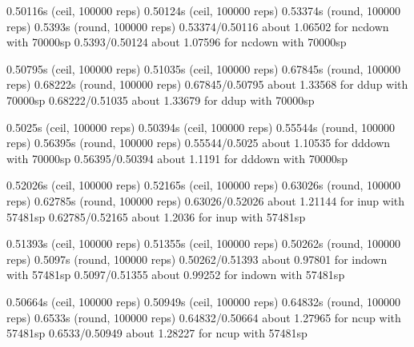 0.50116s (ceil, 100000 reps)                               0.50124s (ceil, 100000 reps)                              
0.53374s (round, 100000 reps)                              0.5393s (round, 100000 reps)                              
0.53374/0.50116 about 1.06502 for ncdown with 70000sp      0.5393/0.50124 about 1.07596 for ncdown with 70000sp      
                                                                                                                     
0.50795s (ceil, 100000 reps)                               0.51035s (ceil, 100000 reps)                              
0.67845s (round, 100000 reps)                              0.68222s (round, 100000 reps)                             
0.67845/0.50795 about 1.33568 for ddup with 70000sp        0.68222/0.51035 about 1.33679 for ddup with 70000sp       
                                                                                                                     
0.5025s (ceil, 100000 reps)                                0.50394s (ceil, 100000 reps)                              
0.55544s (round, 100000 reps)                              0.56395s (round, 100000 reps)                             
0.55544/0.5025 about 1.10535 for dddown with 70000sp       0.56395/0.50394 about 1.1191 for dddown with 70000sp      
                                                                                                                     
0.52026s (ceil, 100000 reps)                               0.52165s (ceil, 100000 reps)                              
0.63026s (round, 100000 reps)                              0.62785s (round, 100000 reps)                             
0.63026/0.52026 about 1.21144 for inup with 57481sp        0.62785/0.52165 about 1.2036 for inup with 57481sp        
                                                                                                                     
0.51393s (ceil, 100000 reps)                               0.51355s (ceil, 100000 reps)                              
0.50262s (round, 100000 reps)                              0.5097s (round, 100000 reps)                              
0.50262/0.51393 about 0.97801 for indown with 57481sp      0.5097/0.51355 about 0.99252 for indown with 57481sp      
                                                                                                                     
0.50664s (ceil, 100000 reps)                               0.50949s (ceil, 100000 reps)                              
0.64832s (round, 100000 reps)                              0.6533s (round, 100000 reps)                              
0.64832/0.50664 about 1.27965 for ncup with 57481sp        0.6533/0.50949 about 1.28227 for ncup with 57481sp        
                                                                                                                     
